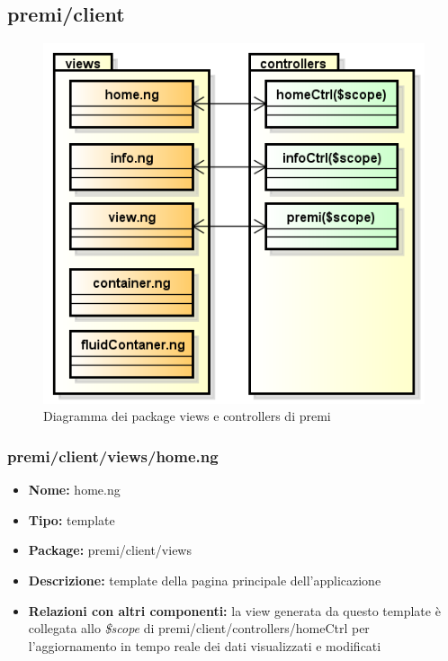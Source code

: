\subsection{premi/client}
\begin{figure}[h]
\begin{center}
\includegraphics[scale=0.45]{img/diapkg/client.png}
\caption{Diagramma dei package views e controllers di premi}
\end{center}
\end{figure}


\subsubsection{premi/client/views/home.ng}
\begin{itemize}
  \item[] \textbf{Nome:} home.ng
  \item[] \textbf{Tipo:} template
  \item[] \textbf{Package:} premi/client/views
  \item[] \textbf{Descrizione:} template della pagina principale dell'applicazione
  \item[] \textbf{Relazioni con altri componenti:} la view generata da questo template è collegata allo \textit{\$scope} di premi/client/controllers/homeCtrl per l'aggiornamento in tempo reale dei dati visualizzati e modificati
\end{itemize}

